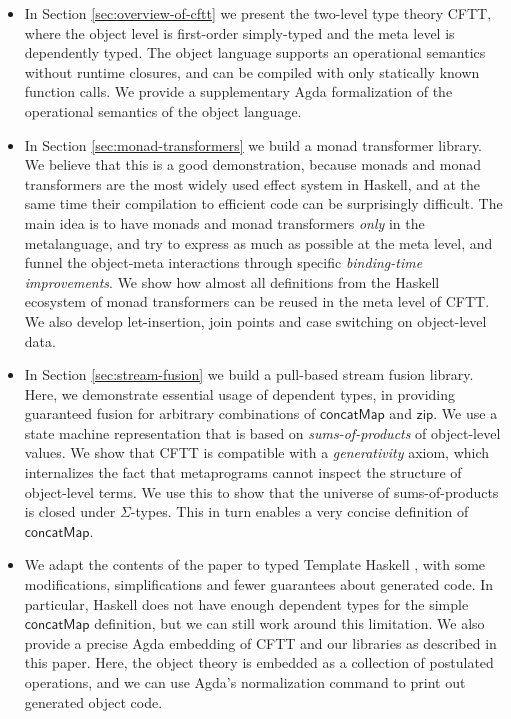 \documentclass[acmsmall,screen,review,anonymous]{acmart}
\newcommand{\mit}[1]{{\mathsf{#1}}}
\newcommand{\msf}[1]{{\mathsf{#1}}}
\newcommand{\concatMap}{\msf{concatMap}}
\theoremstyle{remark}
\begin{document}
\begin{itemize}
\item In Section \ref{sec:overview-of-cftt} we present the two-level type theory
  CFTT, where the object level is first-order simply-typed and the meta level is
  dependently typed. The object language supports an operational semantics
  without runtime closures, and can be compiled with only statically known
  function calls. We provide a supplementary Agda formalization of the
  operational semantics of the object language.
\item In Section \ref{sec:monad-transformers} we build a monad transformer library. We believe
  that this is a good demonstration, because monads and monad transformers are
  the most widely used effect system in Haskell, and at the same time their
  compilation to efficient code can be surprisingly difficult. The main idea is
  to have monads and monad transformers \emph{only} in the metalanguage, and try
  to express as much as possible at the meta level, and funnel the object-meta
  interactions through specific \emph{binding-time improvements}.  We show how
  almost all definitions from the Haskell ecosystem of monad transformers can be
  reused in the meta level of CFTT. We also develop let-insertion, join points
  and case switching on object-level data.
\item In Section \ref{sec:stream-fusion} we build a pull-based stream fusion library. Here,
  we demonstrate essential usage of dependent types, in providing guaranteed
  fusion for arbitrary combinations of $\concatMap$ and $\mit{zip}$. We use a
  state machine representation that is based on \emph{sums-of-products} of
  object-level values. We show that CFTT is compatible with a
  \emph{generativity} axiom, which internalizes the fact that metaprograms
  cannot inspect the structure of object-level terms. We use this to show that
  the universe of sums-of-products is closed under $\Sigma$-types. This in turn
  enables a very concise definition of $\concatMap$.
\item
  We adapt the contents of the paper to typed Template Haskell
  \cite{DBLP:journals/pacmpl/XiePLWYW22}, with some modifications,
  simplifications and fewer guarantees about generated code.  In particular,
  Haskell does not have enough dependent types for the simple $\concatMap$
  definition, but we can still work around this limitation. We also provide a
  precise Agda embedding of CFTT and our libraries as described in this
  paper. Here, the object theory is embedded as a collection of postulated
  operations, and we can use Agda's normalization command to print out generated
  object code.
\end{itemize}
\end{document}

